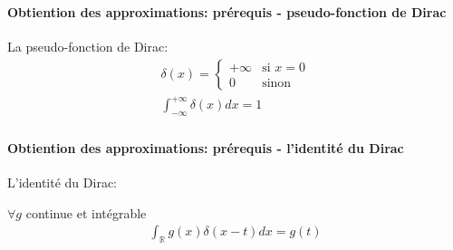 \begin{frame}
    \frametitle{\sndpti}
    \framesubtitle{Obtiention des approximations: prérequis - pseudo-fonction de Dirac}

    \begin{tcolorbox}
        La pseudo-fonction de Dirac:
        \begin{align*}
            \delta(x) =
           \begin{cases}
             + \infty & \text{si } x=0 \\
             0 & \text{sinon}
            \end{cases} \\
            \int_{-\infty}^{+\infty} \delta(x)dx = 1
           \end{align*}
    \end{tcolorbox}

    
\end{frame}


\begin{frame}
    \frametitle{\sndpti}
    \framesubtitle{Obtiention des approximations: prérequis - l'identité du Dirac}

    \begin{tcolorbox}
        L'identité du Dirac:

        $\forall g$ continue et intégrable
        \begin{align*}
            \int_\mathbb{R} g(x)\delta(x-t)dx = g(t)
           \end{align*}
    \end{tcolorbox}

\end{frame}

